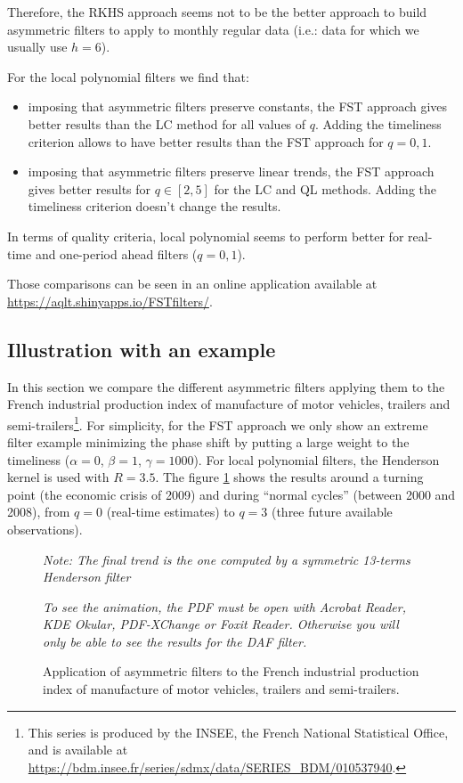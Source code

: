 \documentclass[
  12pt,
  ,
  a4paper]{article}
\newcommand\1{\mathds{1}}
\begin{document}
\faArrowCircleRight{} Therefore, the RKHS approach seems not to be the better approach to build asymmetric filters to apply to monthly regular data (i.e.: data for which we usually use \(h=6\)).

For the local polynomial filters we find that:

\begin{itemize}
\item
  imposing that asymmetric filters preserve constants, the FST approach gives better results than the LC method for all values of \(q\).
  Adding the timeliness criterion allows to have better results than the FST approach for \(q=0,1\).
\item
  imposing that asymmetric filters preserve linear trends, the FST approach gives better results for \(q\in[2,5]\) for the LC and QL methods.
  Adding the timeliness criterion doesn't change the results.
\end{itemize}

\faArrowCircleRight{} In terms of quality criteria, local polynomial seems to perform better for real-time and one-period ahead filters (\(q=0,1\)).

Those comparisons can be seen in an online application available at \url{https://aqlt.shinyapps.io/FSTfilters/}.

\hypertarget{illustration-with-an-example}{%
\subsection{Illustration with an example}\label{illustration-with-an-example}}

In this section we compare the different asymmetric filters applying them to the French industrial production index of manufacture of motor vehicles, trailers and semi-trailers\footnote{This series is produced by the INSEE, the French National Statistical Office, and is available at \url{https://bdm.insee.fr/series/sdmx/data/SERIES_BDM/010537940}.}.
For simplicity, for the FST approach we only show an extreme filter example minimizing the phase shift by putting a large weight to the timeliness (\(\alpha = 0\), \(\beta = 1\), \(\gamma = 1000\)).
For local polynomial filters, the Henderson kernel is used with \(R=3.5\).
The figure \ref{fig:cl2all} shows the results around a turning point (the economic crisis of 2009) and during ``normal cycles'' (between 2000 and 2008), from \(q=0\) (real-time estimates) to \(q=3\) (three future available observations).

\begin{figure}[!ht]
\caption{Application of asymmetric filters to the French industrial production index of manufacture of motor vehicles, trailers and semi-trailers.}\label{fig:cl2all}\footnotesize
\emph{Note: The final trend is the one computed by a symmetric 13-terms Henderson filter}

\emph{To see the animation, the PDF must be open with Acrobat Reader, KDE Okular, PDF-XChange or Foxit Reader.
Otherwise you will only be able to see the results for the DAF filter.}
\end{figure}
\end{document}
